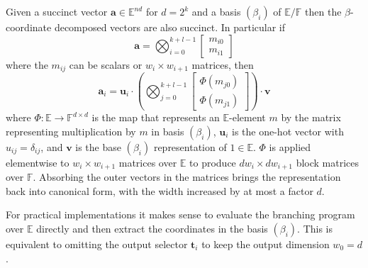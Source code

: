 \begin{theorem}
Given a succinct vector $\mathbf{a} \in \mathbb{E}^{nd}$ for $d= 2^k$ and a basis $(\beta_i)$ of $\mathbb{E}/\mathbb{F}$ then the $\beta$-coordinate decomposed vectors are also succinct. In particular if
\[
\mathbf{a} = \bigotimes_{i=0}^{k+l-1} 
\begin{bmatrix}
m_{i0} \\ m_{i1}
\end{bmatrix}
\]
where the $m_{ij}$ can be scalars or $w_i \times w_{i+1}$ matrices, then
\[
\mathbf{a}_i = \mathbf{u}_i \cdot
\left(
\bigotimes_{j=0}^{k+l-1} 
\begin{bmatrix}
\Phi (m_{j0}) \\ \Phi(m_{j1})
\end{bmatrix}
\right)
\cdot \mathbf{v}
\]
where $\Phi : \mathbb{E} \to \mathbb{F}^{d \times d}$ is the map that represents an $\mathbb{E}$-element $m$ by the matrix representing multiplication by $m$ in basis $(\beta_i)$, $\mathbf{u}_i$ is the one-hot vector with $u_{ij} = \delta_{ij}$, and $\mathbf{v}$ is the base $(\beta_i)$ representation of $1 \in \mathbb{E}$. $\Phi$ is applied elementwise to $w_i \times w_{i+1}$ matrices over $\mathbb{E}$ to produce $dw_i \times dw_{i+1}$ block matrices over $\mathbb{F}$. Absorbing the outer vectors in the matrices brings the representation back into canonical form, with the width increased by at most a factor $d$.
\end{theorem}

For practical implementations it makes sense to evaluate the branching program over $\mathbb{E}$ directly and then extract the coordinates in the basis $(\beta_i)$. This is equivalent to omitting the output selector $\mathbf{t}_i$ to keep the output dimension $w_0 = d$.

